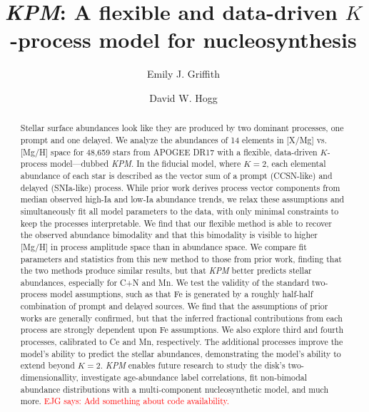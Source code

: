 \documentclass[modern]{aastex631}
\newcommand{\ejg}[1]{\textcolor{red}{EJG says: #1}}
\newcommand{\name}{\textsl{KPM}}
\begin{document}
\title{\name: A flexible and data-driven $K$-process model for nucleosynthesis}


\author[0000-0001-9345-9977]{Emily J. Griffith}

\author[0000-0003-2866-9403]{David W. Hogg}

\begin{abstract}\noindent %
Stellar surface abundances look like they are produced by two dominant processes, one prompt and one delayed.
We analyze the abundances of 14 elements in [X/Mg] vs. [Mg/H] space for 48,659 stars from APOGEE DR17 with a flexible, data-driven $K$-process model---dubbed \name.
In the fiducial model, where $K=2$, each elemental abundance of each star is described as the vector sum of a prompt (CCSN-like) and delayed (SNIa-like) process.
While prior work derives process vector components from median observed high-Ia and low-Ia abundance trends, we relax these assumptions and simultaneously fit all model parameters to the data, with only minimal constraints to keep the processes interpretable.
We find that our flexible method is able to recover the observed abundance bimodality and that this bimodality is visible to higher [Mg/H] in process amplitude space than in abundance space.
We compare fit parameters and statistics from this new method to those from prior work, finding that the two methods produce similar results, but that \name{} better predicts stellar abundances, especially for C+N and Mn.
We test the validity of the standard two-process model assumptions, such as that Fe is generated by a roughly half-half combination of prompt and delayed sources.
We find that the assumptions of prior works are generally confirmed, but that the inferred fractional contributions from each process are strongly dependent upon Fe assumptions.
We also explore third and fourth processes, calibrated to Ce and Mn, respectively. The additional processes improve the model's ability to predict the stellar abundances, demonstrating the model's ability to extend beyond $K=2$. \name{} enables future research to study the disk's two-dimensionallity, investigate age-abundance label correlations, fit non-bimodal abundance distributions with a multi-component nucleosynthetic model, and much more. \ejg{Add something about code availability.} 
\end{abstract}
\end{document}

